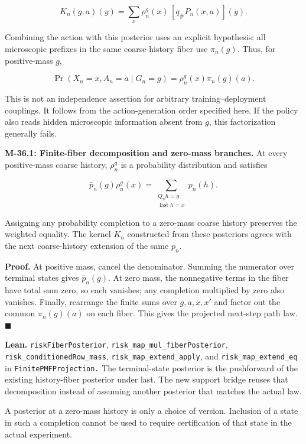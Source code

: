 \documentclass[
  english,
  11pt,
  oneside]{book}
\begin{document}
\[K_n(g,a)(y)=\sum_x\rho_n^g(x)\,[q_\#P_n(x,a)](y).\]

Combining the action with this posterior uses an explicit hypothesis: all microscopic prefixes in the same coarse-history fiber use \(\pi_n(g)\). Thus, for positive-mass \(g\),

\[\Pr(X_n=x,A_n=a\mid G_n=g)=\rho_n^g(x)\pi_n(g)(a).\]

This is not an independence assertion for arbitrary training--deployment couplings. It follows from the action-generation order specified here. If the policy also reads hidden microscopic information absent from \(g\), this factorization generally fails.

\hypertarget{m-36-1}{}\label{m-36-1}

\textbf{M-36.1: Finite-fiber decomposition and zero-mass branches.} At every positive-mass coarse history, \(\rho_n^g\) is a probability distribution and satisfies

\[\bar p_n(g)\rho_n^g(x)
=\sum_{\substack{Q_nh=g\\\operatorname{last}h=x}}p_n(h).\]

Assigning any probability completion to a zero-mass coarse history preserves the weighted equality. The kernel \(K_n\) constructed from these posteriors agrees with the next coarse-history extension of the same \(p_n\).

\textbf{Proof.} At positive mass, cancel the denominator. Summing the numerator over terminal states gives \(\bar p_n(g)\). At zero mass, the nonnegative terms in the fiber have total sum zero, so each vanishes; any completion multiplied by zero also vanishes. Finally, rearrange the finite sums over \(g,a,x,x'\) and factor out the common \(\pi_n(g)(a)\) on each fiber. This gives the projected next-step path law. \(\blacksquare\)

\textbf{Lean.} \nolinkurl{riskFiberPosterior}, \nolinkurl{risk_map_mul_fiberPosterior}, \nolinkurl{risk_conditionedRow_mass}, \nolinkurl{risk_map_extend_apply}, and \nolinkurl{risk_map_extend_eq} in \nolinkurl{FinitePMFProjection.} The terminal-state posterior is the pushforward of the existing history-fiber posterior under last. The new support bridge reuses that decomposition instead of assuming another posterior that matches the actual law.

A posterior at a zero-mass history is only a choice of version. Inclusion of a state in such a completion cannot be used to require certification of that state in the actual experiment.
\end{document}
